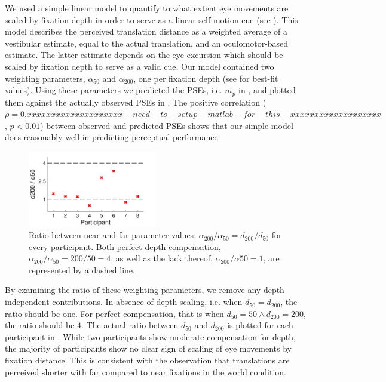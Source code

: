 We used a simple linear model to quantify to what extent eye movements are scaled by fixation depth in order to serve as a linear self-motion cue (see ). This model describes the perceived translation distance as a weighted average of a vestibular estimate, equal to the actual translation, and an oculomotor-based estimate. The latter estimate depends on the eye excursion which should be scaled by fixation depth to serve as a valid cue. Our model contained two weighting parameters, $\alpha_{50}$ and $\alpha_{200}$, one per fixation depth (see  for best-fit values). Using these parameters we predicted the PSEs, i.e. $m_p$ in , and plotted them against the actually observed PSEs in . The positive correlation ($\rho = 0.xxxxxxxxxxxxxxxxxxxx-need-to-setup-matlab-for-this-xxxxxxxxxxxxxxxxxxx$, $p < 0.01$) between observed and predicted PSEs shows that our simple model does reasonably well in predicting perceptual performance.

\begin{figure}
    \includegraphics[width=0.5\textwidth]{src/paper4/p4_figure5.pdf}

	\caption{Ratio between near and far parameter values, $\alpha_{200} / \alpha_{50} = d_{200} / d_{50}$ for every participant. Both perfect depth compensation, $\alpha_{200} / \alpha_{50} = 200 / 50 = 4$, as well as the lack thereof, $\alpha_{200} / \alpha{50} = 1$, are represented by a dashed line.}
	\label{p4:fig5}
\end{figure}

By examining the ratio of these weighting parameters, we remove any depth-independent contributions. In absence of  depth scaling, i.e. when $d_{50} = d_{200}$, the ratio should be one. For perfect compensation, that is when $d_{50} = 50  \wedge d_{200} = 200$, the ratio should be $4$. The actual ratio between $d_{50}$ and $d_{200}$ is plotted for each participant in . While two participants show moderate compensation for depth, the majority of participants show no clear sign of scaling of eye movements by fixation distance. This is consistent with the observation that translations are perceived shorter with far compared to near fixations in the world condition.


